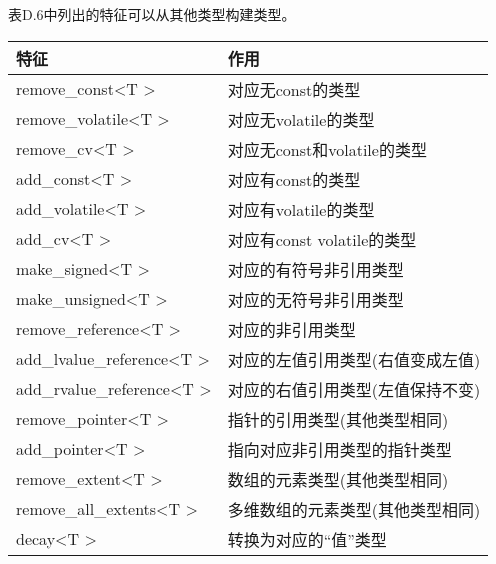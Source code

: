 
表D.6中列出的特征可以从其他类型构建类型。

\begin{table}[H]
	\begin{center}
	\begin{tabular}{l|l}
		\hline
		\textbf{特征}                                    & \textbf{作用}                                                \\ \hline
		remove\_const\textless{}T \textgreater{}          & 对应无const的类型                               \\ \hline
		remove\_volatile\textless{}T \textgreater{}       & 对应无volatile的类型                            \\ \hline
		remove\_cv\textless{}T \textgreater{}             & 对应无const和volatile的类型                  \\ \hline
		add\_const\textless{}T \textgreater{}             & 对应有const的类型                                       \\ \hline
		add\_volatile\textless{}T \textgreater{}          & 对应有volatile的类型                                    \\ \hline
		add\_cv\textless{}T \textgreater{}                & 对应有const volatile的类型                              \\ \hline
		make\_signed\textless{}T \textgreater{}           & 对应的有符号非引用类型                         \\ \hline
		make\_unsigned\textless{}T \textgreater{}         & 对应的无符号非引用类型                       \\ \hline
		remove\_reference\textless{}T \textgreater{}      & 对应的非引用类型                                \\ \hline
		add\_lvalue\_reference\textless{}T \textgreater{} & 对应的左值引用类型(右值变成左值)   \\ \hline
		add\_rvalue\_reference\textless{}T \textgreater{} & 对应的右值引用类型(左值保持不变)   \\ \hline
		remove\_pointer\textless{}T \textgreater{}        & 指针的引用类型(其他类型相同)               \\ \hline
		add\_pointer\textless{}T \textgreater{}           & 指向对应非引用类型的指针类型             \\ \hline
		remove\_extent\textless{}T \textgreater{}         & 数组的元素类型(其他类型相同)                 \\ \hline
		remove\_all\_extents\textless{}T \textgreater{}   & 多维数组的元素类型(其他类型相同) \\ \hline
		decay\textless{}T \textgreater{}                  & 转换为对应的“值”类型                     \\ \hline
	\end{tabular}
	\end{center}
\end{table}

